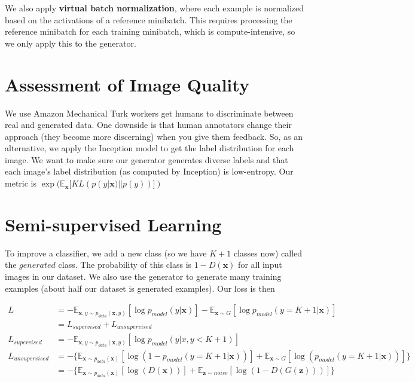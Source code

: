 \documentclass[a4paper]{article}
\begin{document}
We also apply \textbf{virtual batch normalization}, where each example is
normalized based on the activations of a reference minibatch. This requires
processing the reference minibatch for each training minibatch, which is
compute-intensive, so we only apply this to the generator.

\section{Assessment of Image Quality}
We use Amazon Mechanical Turk workers get humans to discriminate between real
and generated data. One downside is that human annotators change their
approach (they become more discerning) when you give them feedback. So, as an
alternative, we apply the Inception model to get the label distribution for
each image. We want to make sure our generator generates diverse labels and
that each image's label distribution (as computed by Inception) is low-entropy.
Our metric is $\exp(\mathbb{E}_{\bm{x}}[KL(p(y|\bm{x}) || p(y))])$

\section{Semi-supervised Learning}
To improve a classifier, we add a new class (so we have $K + 1$ classes now)
called the $generated$ class. The probability of this class is $1 - D(\bm{x})$
for all input images in our dataset. We also use the generator to generate
many training examples (about half our dataset is generated examples). Our
loss is then

\begin{align}
  L &= -\mathbb{E}_{\bm{x}, y \sim p_{data}(\bm{x}, y)}[
    \log{p_{model}(y | \bm{x})}
  ] - \mathbb{E}_{\bm{x} \sim G}[
    \log{p_{model}(y = K + 1 | \bm{x})}
  ] \\
  &= L_{supervised} + L_{unsupervised} \\
  L_{supervised} &= -\mathbb{E}_{\bm{x}, y \sim p_{data}(\bm{x}, y)}[
    \log{p_{model}(y | x, y < K + 1)}
  ] \\
  L_{unsupervised} &= -\{
    \mathbb{E}_{\bm{x} \sim p_{data}(\bm{x})}[
      \log(1 - p_{model}(y = K + 1 | \bm{x}))
    ] + \mathbb{E}_{\bm{x} \sim G}[
      \log(p_{model}(y = K + 1 | \bm{x}))
    ]
  \} \\
  &= -\{
    \mathbb{E}_{\bm{x} \sim p_{data}(\bm{x})}[
      \log(D(\bm{x}))
    ] + \mathbb{E}_{\bm{z} \sim noise}[
      \log(1 - D(G(\bm{z})))
    ]
  \}
\end{align}
\end{document}
